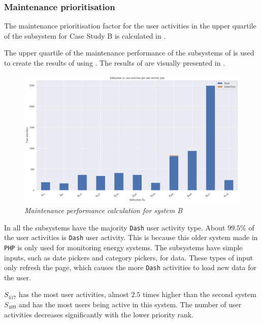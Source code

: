 \subsubsection{Maintenance prioritisation}
The maintenance prioritisation factor for the user activities in the upper quartile of the subsystem for Case Study B is calculated in .



The upper quartile of the maintenance performance of the subsystems of  is used to create the results of  using . The results of  are visually presented in .

\begin{figure}[!htb]
	\centering %
	\includegraphics[width=0.95\linewidth]{img/ch3/analysis/case_B_subsystems_1.pdf}
	\caption[Maintenance performance calculation for system B]
	{\textit{Maintenance performance calculation for system B}}\label{fig:ch3_systemsBBar}
\end{figure} 

In  all the subsystems have the majority \texttt{Dash} user activity type. About $99.5\%$ of the user activities is \texttt{Dash} user activity. This is because this older system made in \texttt{PHP} is only used for monitoring energy systems. The subsystems have simple inputs, such as date pickers and category pickers, for data. These types of input only refresh the page, which causes the more \texttt{Dash} activities to load new data for the user.\par $S_{417}$ has the most user activities, almost $2.5$ times higher than the second system $S_{409}$ and has the most users being active in this system. The number of user activities decreases significantly with the lower priority rank.

